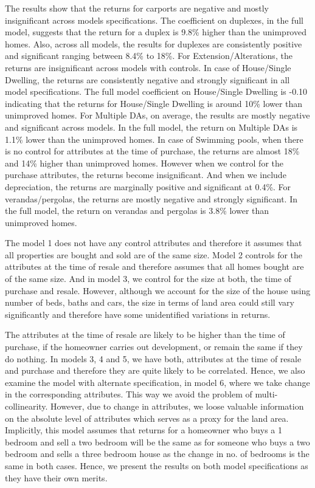 \documentclass{article}
\begin{document}
The results show that the returns for carports are negative and mostly insignificant across models specifications. The coefficient on duplexes, in the full model, suggests that the return for a duplex is 9.8\% higher than the unimproved homes. Also, across all models, the results for duplexes are consistently positive and significant ranging between 8.4\% to 18\%. For Extension/Alterations, the returns are insignificant across models with controls. In case of House/Single Dwelling, the returns are consistently negative and strongly significant in all model specifications. The full model coefficient on House/Single Dwelling is -0.10 indicating that the returns for House/Single Dwelling is around 10\% lower than unimproved homes. For Multiple DAs, on average, the results are mostly negative and significant across models. In the full model, the return on Multiple DAs is 1.1\% lower than the unimproved homes. In case of Swimming pools, when there is no control for attributes at the time of purchase, the returns are almost 18\% and 14\% higher than unimproved homes. However when we control for the purchase attributes, the returns become insignificant. And when we include depreciation, the returns are marginally positive and significant at 0.4\%. For verandas/pergolas, the returns are mostly negative and strongly significant. In the full model, the return on verandas and pergolas is 3.8\% lower than unimproved homes.

The model 1 does not have any control attributes and therefore it assumes that all properties are bought and sold are of the same size. Model 2 controls for the attributes at the time of resale and therefore assumes that all homes bought are of the same size. And in model 3, we control for the size at both, the time of purchase and resale. However, although we account for the size of the house using number of beds, baths and cars, the size in terms of land area could still vary significantly and therefore have some unidentified variations in returns. 

The attributes at the time of resale are likely to be higher than the time of purchase, if the homeowner carries out development, or remain the same if they do nothing. In models 3, 4 and 5, we have both, attributes at the time of resale and purchase and therefore they are quite likely to be correlated. Hence, we also examine the model with alternate specification, in model 6, where we take change in the corresponding attributes. This way we avoid the problem of multi-collinearity. However, due to change in attributes, we loose valuable information on the absolute level of attributes which serves as a proxy for the land area. Implicitly, this model assumes that returns for a homeowner who buys a 1 bedroom and sell a two bedroom will be the same as for someone who buys a two bedroom and sells a three bedroom house as the change in no. of bedrooms is the same in both cases. Hence, we present the results on both model specifications as they have their own merits.
\end{document}
